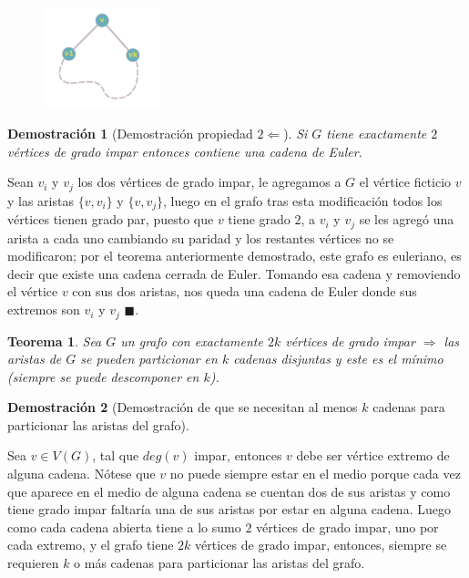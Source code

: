 \documentclass[a4paper,1pt]{report}
\newtheorem*{teo}{Teorema}
\newtheorem*{dem}{Demostración}
\begin{document}
\begin{figure}[H]
    \centering
    \includegraphics[width=0.3\textwidth]{figures3/Camono+v.png}
\end{figure}  

\begin{dem}[Demostraci\'on propiedad $2 \Leftarrow$] Si $G$ tiene exactamente $2$ v\'ertices de grado impar entonces contiene una cadena de Euler.\end{dem}

Sean $v_i$ y $v_j$ los dos v\'ertices de grado impar, le agregamos a $G$ el v\'ertice ficticio $v$ y las aristas $\{v, v_i\}$ y $\{v, v_j\}$, luego en el grafo tras esta modificaci\'on todos los v\'ertices tienen grado par, puesto que $v$ tiene grado $2$, a $v_i$ y $v_j$ se les agreg\'o una arista a cada uno cambiando su paridad y los restantes v\'ertices no se modificaron; por el teorema anteriormente demostrado, este grafo es euleriano, es decir que existe una cadena cerrada de Euler. Tomando esa cadena y removiendo el v\'ertice $v$ con sus dos aristas, nos queda una cadena de Euler donde sus extremos son $v_i$ y $v_j$ $\blacksquare$.

\begin{teo}
Sea $G$ un grafo con exactamente $2k$ v\'ertices de grado impar $\Rightarrow$ las aristas de $G$ se pueden particionar en $k$ cadenas disjuntas y este es el m\'inimo (siempre se puede descomponer en $k$).
\end{teo}

\begin{dem}[Demostraci\'on de que se necesitan al menos $k$ cadenas para particionar las aristas del grafo]\end{dem}

Sea $v \in V(G)$, tal que $deg(v)$ impar, entonces $v$ debe ser v\'ertice extremo de alguna cadena. N\'otese que $v$ no puede siempre estar en el medio porque cada vez que aparece en el medio de alguna cadena se cuentan dos de sus aristas y como tiene grado impar faltar\'ia una de sus aristas por estar en alguna cadena. 
Luego como cada cadena abierta tiene a lo sumo $2$ v\'ertices de grado impar, uno por cada extremo, y el grafo tiene $2k$ v\'ertices de grado impar, entonces, siempre se requieren $k$ o m\'as cadenas para particionar las aristas del grafo. 
\end{document}
